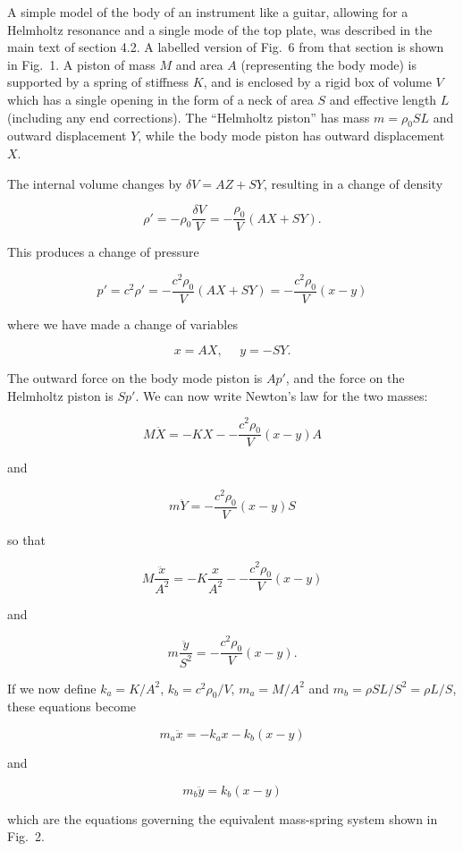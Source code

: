   A simple model of the body of an instrument like a guitar, allowing for a 
  Helmholtz resonance and a single mode of the top plate, was described in the 
  main text of section 4.2. A labelled version of Fig.\ 6 from that section is 
  shown in Fig.\ 1. A piston of mass $M$ and area $A$ (representing the body 
  mode) is supported by a spring of stiffness $K$, and is enclosed by a rigid 
  box of volume $V$ which has a single opening in the form of a neck of area 
  $S$ and effective length $L$ (including any end corrections). The ``Helmholtz 
  piston'' has mass $m=\rho_0 SL$ and outward displacement $Y$, while the body 
  mode piston has outward displacement $X$. 

  The internal volume changes by $\delta V = AZ + SY$, resulting in a change of 
  density 

  $$\rho' = -\rho_0 \dfrac{\delta V}{V}=-\dfrac{\rho_0}{V} (AX+SY) . \tag{1}$$ 

  This produces a change of pressure 

  $$p' = c^2 \rho' =- \dfrac{c^2 \rho_0}{V} (AX+SY)=- \dfrac{c^2 \rho_0}{V} 
  (x-y) \tag{12}$$ 

  where we have made a change of variables 

  $$x=AX,\mathrm{~~~~~~}y=-SY . \tag{3}$$ 

  The outward force on the body mode piston is $Ap'$, and the force on the 
  Helmholtz piston is $Sp'$. We can now write Newton's law for the two masses: 

  $$M \ddot{X}=-KX -- \dfrac{c^2 \rho_0}{V} (x-y)A \tag{4}$$ 

  and 

  $$m \ddot{Y}=- \dfrac{c^2 \rho_0}{V} (x-y)S \tag{5}$$ 

  so that 

  $$M \dfrac{\ddot{x}}{A^2}=-K\dfrac{x}{A^2} -- \dfrac{c^2 \rho_0}{V} (x-y) 
  \tag{6}$$ 

  and 

  $$m \dfrac{\ddot{y}}{S^2}=- \dfrac{c^2 \rho_0}{V} (x-y) . \tag{7}$$ 

  If we now define $k_a=K/A^2$, $k_b=c^2 \rho_0/V$, $m_a=M/A^2$ and $m_b=\rho 
  SL/S^2 =\rho L/S$, these equations become 

  $$m_a \ddot{x}=-k_a x -k_b(x-y) \tag{8}$$ 

  and 

  $$m_b \ddot{y}=k_b (x-y) \tag{9}$$ 

  which are the equations governing the equivalent mass-spring system shown in 
  Fig.\ 2. 

